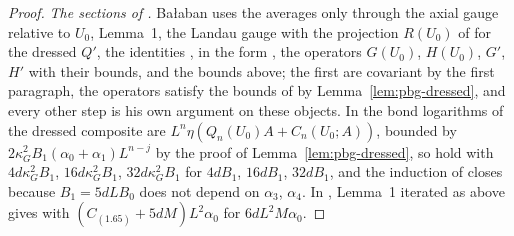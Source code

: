 \documentclass[11pt]{preprint}
\numberwithin{equation}{section}
\theoremstyle{definition}
\theoremstyle{remark}
\theoremstyle{plain}
\begin{document}
\begin{proof}
\emph{The sections of \cite{BalabanREG}.} Ba{\l}aban uses the averages only through the axial gauge \cite[(1.19)]{BalabanREG} relative to $U_0$, Lemma~1, the Landau gauge \cite[(1.27)]{BalabanREG} with the projection $R(U_0)$ of \cite{BalabanPBG} for the dressed $Q'$, the identities \cite[(1.29)--(1.31)]{BalabanREG}, \cite[Proposition~4]{BalabanAVG} in the form \cite[(1.56)]{BalabanREG}, the operators $G(U_0)$, $H(U_0)$, $G'$, $H'$ with their bounds, and the bounds above; the first are covariant by the first paragraph, the operators satisfy the bounds of \cite{BalabanPBG} by Lemma~\ref{lem:pbg-dressed}, and every other step is his own argument on these objects. In \cite[(1.71)]{BalabanREG} the bond logarithms of the dressed composite are $L^n\eta(Q_n(U_0)A + C_n(U_0; A))$, bounded by $2\kappa_G^2B_1(\alpha_0 + \alpha_1)L^{n-j}$ by the proof of Lemma~\ref{lem:pbg-dressed}, so \cite[(1.71)--(1.76)]{BalabanREG} hold with $4d\kappa_G^2B_1$, $16d\kappa_G^2B_1$, $32d\kappa_G^2B_1$ for $4dB_1$, $16dB_1$, $32dB_1$, and the induction of \cite[Theorem~4]{BalabanREG} closes because $B_1 = 5dLB_0$ does not depend on $\alpha_3$, $\alpha_4$. In \cite[Proposition~6]{BalabanREG}, Lemma~1 iterated as above gives \cite[(1.130), (1.133)]{BalabanREG} with $(C_{(1.65)} + 5dM)L^2\alpha_0$ for $6dL^2M\alpha_0$.


\end{proof}
\end{document}
